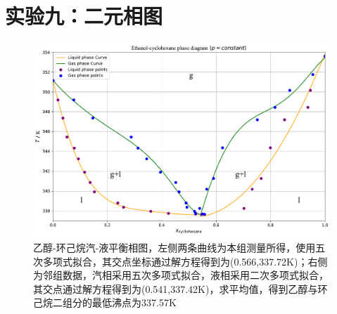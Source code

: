 \documentclass[UTF8,AutoFakeBold,a4paper]{article}
\begin{document}
\section{实验九：二元相图}


\begin{figure}[h]
	\centering
	\includegraphics[scale=0.55]{相图}
	\caption{乙醇-环己烷汽-液平衡相图，左侧两条曲线为本组测量所得，使用五次多项式拟合，其交点坐标通过解方程得到为\textcolor[rgb]{0.54,0.13,0.33}{(0.566,337.72K)}；右侧为邻组数据，汽相采用五次多项式拟合，液相采用二次多项式拟合，其交点通过解方程得到为\textcolor[rgb]{0.54,0.13,0.33}{(0.541,337.42K)}，求平均值，得到乙醇与环己烷二组分的最低沸点为\textcolor[rgb]{0.54,0.13,0.33}{337.57K}}
	\label{fi5}
\end{figure}
\end{document}
